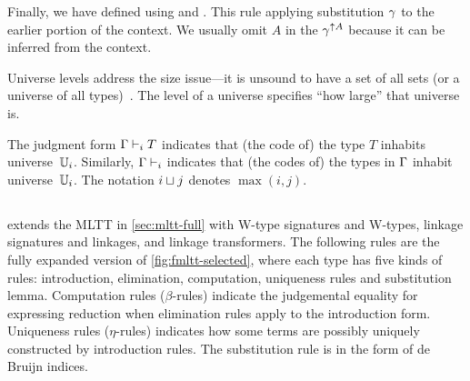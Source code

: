 Finally, we have  defined using  and . This rule applying substitution $\gm$ to the earlier portion of the context. We usually omit $A$ in the $\gm^{\uparrow A}$ because it can be inferred from the context.




Universe levels address the size issue---it is unsound to have a set of all sets
(or a universe of all types)~\cite{hurkens1995simplification}.
The level of a universe specifies ``how large'' that universe is.

The judgment form $\goodType{\Gm}{T}{i}$ indicates that (the code of) the type $T$
inhabits universe~$\cU_i$.
Similarly, $\goodCtx{\Gm}{i}$ indicates that (the codes of) the types in $\Gm$
inhabit universe~$\cU_i$.
The notation $i \lcup j$ denotes $\max(i,j)$.



\subsection{\TT}
\label{sec:fmltt-full}

\TT extends the MLTT in \cref{sec:mltt-full} with W-type signatures and W-types,
linkage signatures and linkages, and linkage transformers. The following rules are the fully expanded version of \cref{fig:fmltt-selected}, where each type has five kinds of rules: introduction, elimination, computation, uniqueness rules and substitution lemma. 
Computation rules ($\beta$-rules) indicate the judgemental equality for expressing reduction when elimination rules apply to the introduction form. Uniqueness rules ($\eta$-rules) indicates how some terms are possibly uniquely constructed by introduction rules. The substitution rule is in the form of de Bruijn indices.

